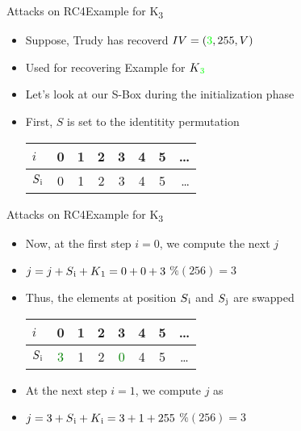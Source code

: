 \documentclass[
	aspectratio=169,	%
	onlytextwidth,		%
	t,					%
	]{beamer}
\begin{document}
\begin{frame}[fragile]{Attacks on RC4}{Example for K\textsubscript{3}}
	\begin{itemize}
		\item Suppose, Trudy has recoverd $IV = (\textcolor{green}{3}, 255, V)$ 
		\item Used for recovering Example for $K\textsubscript{\textcolor{green}{3}}$
		\item Let's look at our S-Box during the initialization phase
		\item First, $S$ is set to the identitity permutation
		\medskip
		\begin{table}[h!]
			\begin{center}
			  \begin{tabular}{l|c|c|c|c|c|c|r}
				$i$ & 0 & 1 & 2 & 3 & 4 & 5 & \dots\\
				\hline
				$S\textsubscript{i}$ & 0 & 1 & 2 & 3 & 4 & 5 & \dots\\
			  \end{tabular}
			\end{center}
		  \end{table}

	\end{itemize}
\end{frame}

\begin{frame}[fragile]{Attacks on RC4}{Example for K\textsubscript{3}}
	\begin{itemize}
		\item Now, at the first step $i=0$, we compute the next $j$
		\item $j = j + S\textsubscript{i} + K\textsubscript{1} = 0 + 0 + 3$ $\%(256) = 3$
		\item Thus, the elements at position $S\textsubscript{i}$ and $S\textsubscript{j}$ are swapped
		\medskip
		\begin{table}[h!]
			\begin{center}
			  \begin{tabular}{l|c|c|c|c|c|c|c}
				$i$ & 0 & 1 & 2 & 3 & 4 & 5 & \dots\\
				\hline
				$S\textsubscript{i}$ & \textcolor{green}{3} & 1 & 2 & \textcolor{green}{0} & 4 & 5 & \dots\\
			  \end{tabular}
			\end{center}
		  \end{table}
		\item At the next step $i = 1$, we compute $j$ as
		\item $j = 3 + S\textsubscript{i} + K\textsubscript{i} = 3 + 1 + 255$ $\%(256) = 3$
	\end{itemize}
\end{frame}
\end{document}
